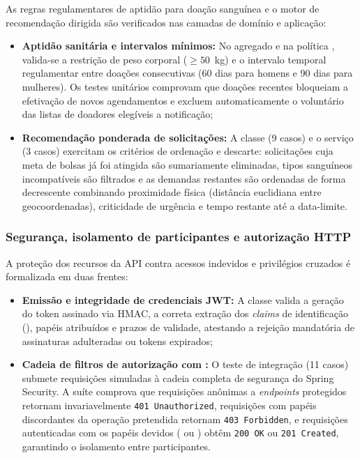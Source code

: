 As regras regulamentares de aptidão para doação sanguínea e o motor de recomendação dirigida são verificados nas camadas de domínio e aplicação:
\begin{itemize}[noitemsep,topsep=2pt]
  \item \textbf{Aptidão sanitária e intervalos mínimos:} No agregado  e na política , valida-se a restrição de peso corporal ($\ge 50$~kg) e o intervalo temporal regulamentar entre doações consecutivas (60 dias para homens e 90 dias para mulheres). Os testes unitários comprovam que doações recentes bloqueiam a efetivação de novos agendamentos e excluem automaticamente o voluntário das listas de doadores elegíveis a notificação;
  \item \textbf{Recomendação ponderada de solicitações:} A classe  (9 casos) e o serviço  (3 casos) exercitam os critérios de ordenação e descarte: solicitações cuja meta de bolsas já foi atingida são sumariamente eliminadas, tipos sanguíneos incompatíveis são filtrados e as demandas restantes são ordenadas de forma decrescente combinando proximidade física (distância euclidiana entre geocoordenadas), criticidade de urgência e tempo restante até a data-limite.
\end{itemize}

\subsubsection{Segurança, isolamento de participantes e autorização HTTP}

A proteção dos recursos da API contra acessos indevidos e privilégios cruzados é formalizada em duas frentes:
\begin{itemize}[noitemsep,topsep=2pt]
  \item \textbf{Emissão e integridade de credenciais JWT:} A classe  valida a geração do token assinado via HMAC, a correta extração dos \textit{claims} de identificação (), papéis atribuídos e prazos de validade, atestando a rejeição mandatória de assinaturas adulteradas ou tokens expirados;
  \item \textbf{Cadeia de filtros de autorização com :} O teste de integração  (11 casos) submete requisições simuladas à cadeia completa de segurança do Spring Security. A suíte comprova que requisições anônimas a \textit{endpoints} protegidos retornam invariavelmente \texttt{401 Unauthorized}, requisições com papéis discordantes da operação pretendida retornam \texttt{403 Forbidden}, e requisições autenticadas com os papéis devidos ( ou ) obtêm \texttt{200 OK} ou \texttt{201 Created}, garantindo o isolamento entre participantes.
\end{itemize}

